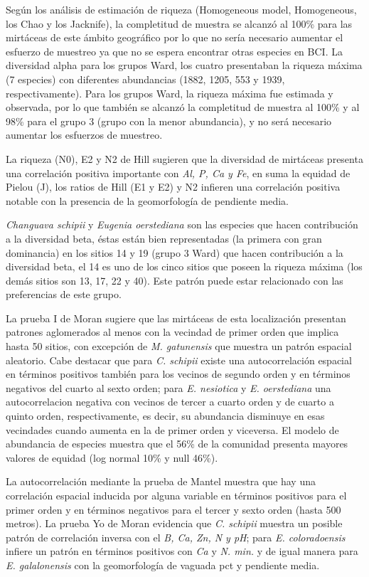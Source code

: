 \documentclass[11pt,]{article}
\begin{document}
Según los análisis de estimación de riqueza (Homogeneous model,
Homogeneous, los Chao y los Jacknife), la completitud de muestra se
alcanzó al 100\% para las mirtáceas de este ámbito geográfico por lo que
no sería necesario aumentar el esfuerzo de muestreo ya que no se espera
encontrar otras especies en BCI. La diversidad alpha para los grupos
Ward, los cuatro presentaban la riqueza máxima (7 especies) con
diferentes abundancias (1882, 1205, 553 y 1939, respectivamente). Para
los grupos Ward, la riqueza máxima fue estimada y observada, por lo que
también se alcanzó la completitud de muestra al 100\% y al 98\% para el
grupo 3 (grupo con la menor abundancia), y no será necesario aumentar
los esfuerzos de muestreo.

La riqueza (N0), E2 y N2 de Hill sugieren que la diversidad de mirtáceas
presenta una correlación positiva importante con \emph{Al, P, Ca y Fe},
en suma la equidad de Pielou (J), los ratios de Hill (E1 y E2) y N2
infieren una correlación positiva notable con la presencia de la
geomorfología de pendiente media.

\emph{Changuava schipii} y \emph{Eugenia oerstediana} son las especies
que hacen contribución a la diversidad beta, éstas están bien
representadas (la primera con gran dominancia) en los sitios 14 y 19
(grupo 3 Ward) que hacen contribución a la diversidad beta, el 14 es uno
de los cinco sitios que poseen la riqueza máxima (los demás sitios son
13, 17, 22 y 40). Este patrón puede estar relacionado con las
preferencias de este grupo.

La prueba I de Moran sugiere que las mirtáceas de esta localización
presentan patrones aglomerados al menos con la vecindad de primer orden
que implica hasta 50 sitios, con excepción de \emph{M. gatunensis} que
muestra un patrón espacial aleatorio. Cabe destacar que para \emph{C.
schipii} existe una autocorrelación espacial en términos positivos
también para los vecinos de segundo orden y en términos negativos del
cuarto al sexto orden; para \emph{E. nesiotica} y \emph{E. oerstediana}
una autocorrelacion negativa con vecinos de tercer a cuarto orden y de
cuarto a quinto orden, respectivamente, es decir, su abundancia
disminuye en esas vecindades cuando aumenta en la de primer orden y
viceversa. El modelo de abundancia de especies muestra que el 56\% de la
comunidad presenta mayores valores de equidad (log normal 10\% y null
46\%).

La autocorrelación mediante la prueba de Mantel muestra que hay una
correlación espacial inducida por alguna variable en términos positivos
para el primer orden y en términos negativos para el tercer y sexto
orden (hasta 500 metros). La prueba Yo de Moran evidencia que \emph{C.
schipii} muestra un posible patrón de correlación inversa con el
\emph{B, Ca, Zn, N y pH}; para \emph{E. coloradoensis} infiere un patrón
en términos positivos con \emph{Ca} y \emph{N. min.} y de igual manera
para \emph{E. galalonensis} con la geomorfología de vaguada pct y
pendiente media.
\end{document}
